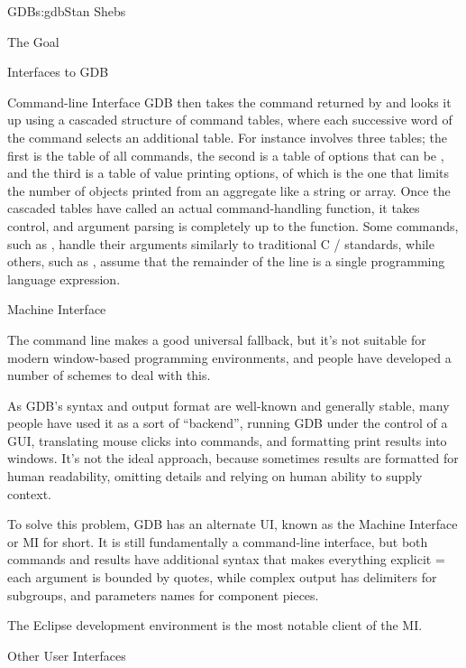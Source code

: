 \begin{aosachapter}{GDB}{s:gdb}{Stan Shebs}
\begin{aosasect1}{The Goal}
\begin{aosasect1}{Interfaces to GDB}
\begin{aosasect2}{Command-line Interface}
GDB then takes the command returned by  and looks it up
using a cascaded structure of command tables, where each successive
word of the command selects an additional table.  For instance
 involves three tables; the first is the
table of all commands, the second is a table of options that can be
, and the third is a table of value printing options, of
which  is the one that limits the number of objects
printed from an aggregate like a string or array.  Once the cascaded
tables have called an actual command-handling function, it takes
control, and argument parsing is completely up to the function.  Some
commands, such as , handle their arguments similarly to
traditional C / standards, while others, such as
, assume that the remainder of the line is a single
programming language expression.

\end{aosasect2}

\begin{aosasect2}{Machine Interface}

The command line makes a good universal fallback, but it's not suitable
for modern window-based programming environments, and people have developed
a number of schemes to deal with this.

As GDB's syntax and output format are well-known and generally stable,
many people have used it as a sort of ``backend'', running GDB under the
control of a GUI, translating mouse clicks into commands, and
formatting print results into windows.  It's not the ideal approach,
because sometimes results are formatted for human readability, omitting
details and relying on human ability to supply context.

To solve this problem, GDB has an alternate UI, known as the Machine
Interface or MI for short.  It is still fundamentally a command-line
interface, but both commands and results have additional syntax that
makes everything explicit = each argument is bounded by quotes, while
complex output has delimiters for subgroups, and parameters names for
component pieces.


The Eclipse development environment is the most notable client of the
MI.

\end{aosasect2}

\begin{aosasect2}{Other User Interfaces}


\end{aosasect2}
\end{aosasect1}
\end{aosasect1}
\end{aosachapter}

